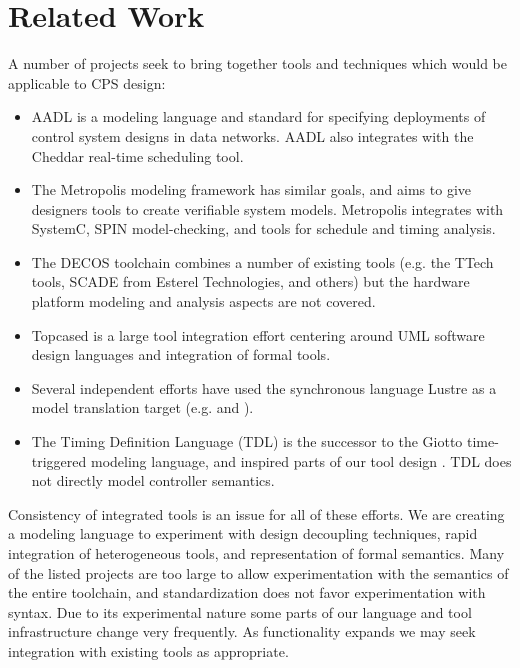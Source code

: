 \section{Related Work}

A number of projects seek to bring together tools and techniques which would be applicable to
CPS design:

\begin{itemize}

\item AADL is a modeling language and standard for specifying deployments of control system 
designs in data networks\cite{modeling:aadl_control_systems}.  AADL also
integrates with the Cheddar real-time scheduling tool\cite{sched:aadl_sched}.

\item The Metropolis modeling framework\cite{modeling:metropolis} has similar goals, and 
aims to give designers tools to create verifiable system models.  Metropolis integrates 
with SystemC, SPIN model-checking, and tools for schedule and timing analysis. 

\item The DECOS toolchain \cite{modeling:decos} combines a number of existing tools (e.g. the 
TTech tools, SCADE from Esterel Technologies, and others) but the hardware platform modeling 
and analysis aspects are not covered.

\item Topcased\cite{tools:Topcased} is a large tool integration effort
centering around UML software design languages and integration of
formal tools.

\item Several independent efforts have used the synchronous language Lustre as a
model translation target (e.g. \cite{modeling:lustre2} and
\cite{modeling:lustre1}).

\item The Timing Definition Language (TDL) is the successor to the Giotto time-triggered
modeling language, and inspired parts of our tool design \cite{timed:tdl} \cite{timed:tdlflexray}.  
TDL does not directly model controller semantics. 

\end{itemize}

Consistency of integrated tools is an issue for all of these efforts. We are creating a modeling 
language to experiment with design decoupling techniques, rapid integration of heterogeneous tools, 
and representation of formal semantics.  Many of the listed projects are too large to allow 
experimentation with the semantics of the entire toolchain, and standardization does not favor 
experimentation with syntax.  Due to its experimental nature some parts of our language and tool 
infrastructure change very frequently.  As functionality expands we may seek integration with 
existing tools as appropriate.
